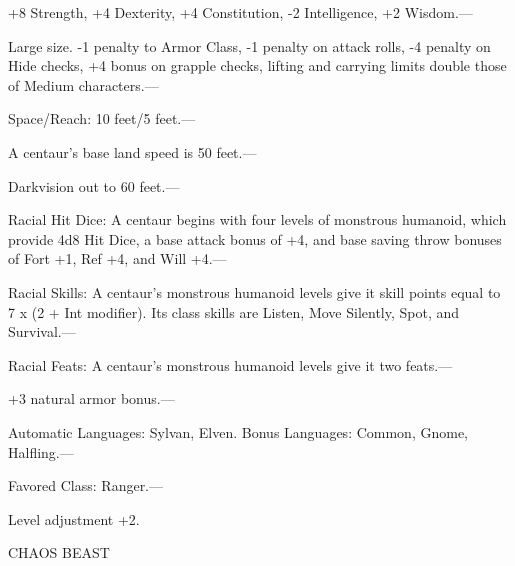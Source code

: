 \documentclass{article}
\begin{document}
\parindent=3pt
+8 Strength, +4 Dexterity, +4 Constitution, -2 Intelligence, +2 Wisdom.---

\parindent=0pt
Large size. -1 penalty to Armor Class, -1 penalty on attack rolls, -4 penalty on 
Hide checks, +4 bonus on grapple checks, lifting and carrying limits double those 
of Medium characters.---

Space/Reach: 10 feet/5 feet.---

A centaur's base land speed is 50 feet.---

Darkvision out to 60 feet.---

Racial Hit Dice: A centaur begins with four levels of monstrous humanoid, which 
provide 4d8 Hit Dice, a base attack bonus of +4, and base saving throw bonuses 
of Fort +1, Ref +4, and Will +4.---

Racial Skills: A centaur's monstrous humanoid levels give it skill points equal 
to 7 x$ $ (2 + Int modifier). Its class skills are Listen, Move Silently, Spot, 
and Survival.---

Racial Feats: A centaur's monstrous humanoid levels give it two feats.--- 

\parindent=3pt
+3 natural armor bonus.--- 

Automatic Languages: Sylvan, Elven. Bonus Languages: Common, Gnome, Halfling.---

Favored Class: Ranger.---

Level adjustment +2.

\vspace{12pt}
\parindent=0pt
{\LARGE{}CHAOS BEAST}
\end{document}
